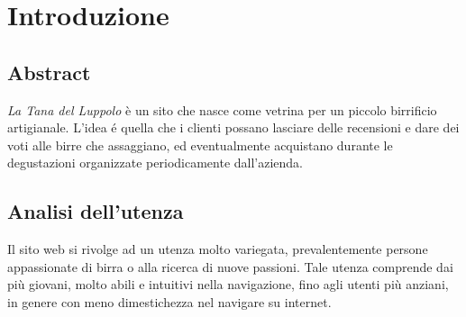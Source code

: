 \section{Introduzione}
\subsection{Abstract}
\textit{La Tana del Luppolo} è un sito che nasce come vetrina per un piccolo birrificio artigianale. L'idea é quella che i clienti possano lasciare delle recensioni e dare dei voti alle birre che assaggiano, ed eventualmente acquistano durante le degustazioni organizzate periodicamente dall'azienda.
\subsection{Analisi dell'utenza}
Il sito web si rivolge ad un utenza molto variegata, prevalentemente persone appassionate di birra o alla ricerca di nuove passioni. Tale utenza comprende dai più giovani, molto abili e intuitivi nella navigazione, fino agli utenti più anziani, in genere con meno dimestichezza nel navigare su internet.